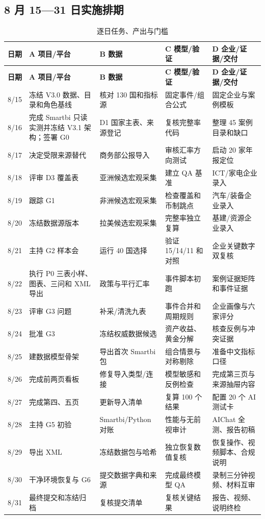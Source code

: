 \documentclass[UTF8,fontset=windows,12pt,openany]{ctexbook}
\begin{document}
\clearpage
\begin{landscape}
\chapter{8 月 15—31 日实施排期}
\begin{longtable}{p{2.2cm}p{4.1cm}p{3.7cm}p{3.7cm}p{3.7cm}}
\caption{逐日任务、产出与门槛}\label{tab:schedule}\\
\toprule
\textbf{日期} & \textbf{A 项目/平台} & \textbf{B 数据} & \textbf{C 模型/验证} & \textbf{D 企业/证据/交付}\\
\midrule
\endfirsthead
\toprule \textbf{日期} & \textbf{A 项目/平台} & \textbf{B 数据} & \textbf{C 模型/验证} & \textbf{D 企业/证据/交付}\\ \midrule
\endhead
8/15 & 冻结 V3.0 数据、目录和角色基线 & 核对 130 国和指标源 & 固定事件/组合公式 & 固定企业与案例模板\\
8/16 & 完成 Smartbi 只读实测并冻结 V3.1 架构；签署 G0 & D1 国家主表、来源登记 & 复核完整率代码 & 整理 45 案例目录和缺口\\
8/17 & 决定受限来源替代 & 商务部公报导入 & 审核汇率方向测试 & 启动 20 家年报定位\\
8/18 & 评审 D3 覆盖表 & 亚洲候选宏观采集 & 建立 QA 基准 & ICT/家电企业录入\\
8/19 & 跟踪 G1 & 非洲候选宏观采集 & 检查覆盖和币制跳点 & 汽车/装备企业录入\\
8/20 & 冻结数据源版本 & 拉美候选宏观采集 & 完整率独立复算 & 基建/资源企业录入\\
8/21 & 主持 G2 样本会 & 运行 40 国选择 & 验证 15/14/11 和对照 & 企业关键数字双复核\\
8/22 & 执行 P0 三表小样、图表、三问和 XML 导出 & 政策与平行汇率 & 事件脚本初跑 & 案例证据矩阵和事件证据\\
8/23 & 评审 G3 问题 & 补采/清洗九表 & 事件合并和周期规则 & 企业画像与六家评分\\
8/24 & 批准 G3 & 冻结权威数据候选 & 资产收益、黄金分解 & 核查反例与冲突证据\\
8/25 & 建数据模型骨架 & 导出首次 Smartbi 包 & 组合情景与对称剔除 & 准备中文指标口径\\
8/26 & 完成前两页看板 & 修复导入类型/连接 & 模型敏感和反例检查 & 完成第三页与来源抽屉内容\\
8/27 & 完成第四、五页 & 更新导入清单 & 复算 100 个结果 & 配置 20 个 AI 测试卡\\
8/28 & 主持 G5 初验 & Smartbi/Python 对账 & 性能与无前视审计 & AIChat 全测、报告初稿\\
8/29 & 导出 XML & 冻结数据包与哈希 & 独立恢复数值复核 & 恢复操作、视频脚本、合规说明\\
8/30 & 干净环境恢复与 G6 & 提交数据字典和来源 & 完成最终模型 QA & 录制三分钟视频、材料互审\\
8/31 & 最终提交和冻结归档 & 复核提交清单 & 复核关键结果 & 报告、视频、说明终检\\
\bottomrule
\end{longtable}
\end{landscape}
\end{document}

